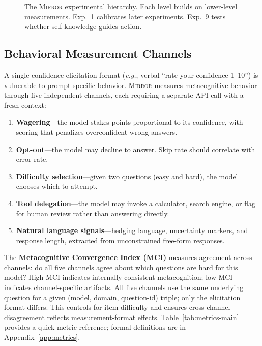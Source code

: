 \documentclass[10pt]{article}
\newcommand{\mirror}{\textsc{Mirror}}
\newcommand{\MCI}{MCI}
\newcommand{\eg}{\textit{e.g.}}
\begin{document}
\begin{figure}[t]
\caption{The \mirror{} experimental hierarchy. Each level builds on lower-level
measurements. Exp.~1 calibrates later experiments. Exp.~9 tests whether
self-knowledge guides action.}
\label{fig:framework}
\end{figure}

\subsection{Behavioral Measurement Channels}

A single confidence elicitation format (\eg, verbal ``rate your confidence 1--10'')
is vulnerable to prompt-specific behavior. \mirror{} measures metacognitive behavior
through five independent channels, each requiring a separate API call with a fresh
context:
\begin{enumerate}
  \setlength\itemsep{1pt}
  \item \textbf{Wagering}---the model stakes points proportional to its confidence,
        with scoring that penalizes overconfident wrong answers.
  \item \textbf{Opt-out}---the model may decline to answer. Skip rate should
        correlate with error rate.
  \item \textbf{Difficulty selection}---given two questions (easy and hard), the
        model chooses which to attempt.
  \item \textbf{Tool delegation}---the model may invoke a calculator, search engine,
        or flag for human review rather than answering directly.
  \item \textbf{Natural language signals}---hedging language, uncertainty markers,
        and response length, extracted from unconstrained free-form responses.
\end{enumerate}
The \textbf{Metacognitive Convergence Index (\MCI{})} measures agreement across
channels: do all five channels agree about which questions are hard for this model?
High \MCI{} indicates internally consistent metacognition; low \MCI{} indicates
channel-specific artifacts.
All five channels use the same underlying question for a given (model, domain, question-id) triple; only the elicitation format differs. This controls for item difficulty and ensures cross-channel disagreement reflects measurement-format effects. Table~\ref{tab:metrics-main} provides a quick metric reference; formal definitions are in Appendix~\ref{app:metrics}.
\end{document}
